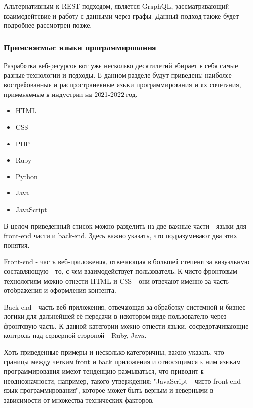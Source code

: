         Альтернативным к REST подходом, является GraphQL, рассматривающий взаимодейтсвие и работу с данными через графы.
        Данный подход также будет подробнее рассмотрен позже.


    \subsubsection{Применяемые языки программирования}
        Разработка веб-ресурсов вот уже несколько десятилетий вбирает в себя самые разные технологии и подходы.
        В данном разделе будут приведены наиболее востребованные и распространенные языки программирования и их сочетания, применяемые в индустрии на 2021-2022 год.
        \begin{itemize}
            \item HTML
            \item CSS
            \item PHP
            \item Ruby
            \item Python
            \item Java
            \item JavaScript
        \end{itemize}
        
        В целом приведенный список можно разделить на две важные части - языки для front-end части и back-end.
        Здесь важно указать, что подразумевают два этих понятия.

        Front-end - часть веб-приложения, отвечающая в большей степени за визуальную составляющую - то, с чем взаимодействует пользователь.
        К чисто фронтовым технологиям можно отнести HTML и CSS - они отвечают именно за часть отображения и оформления контента.
        
        Back-end - часть веб-приложения, отвечающая за обработку системной и бизнес-логики для дальнейшей её передачи в некотором виде пользователю через фронтовую часть.
        К данной категории можно отнести языки, сосредотачивающие контроль над серверной стороной - Ruby, Java.

        Хоть приведенные примеры и несколько категоричны, важно указать, что границы между четким front и back приложения и относящимся к ним языкам программирования имеют тенденцию размываться, что приводит к неоднозначности, например, такого утверждения: "JavaScript - чисто front-end язык программирования", которое может быть верным и неверными в зависимости от множества технических факторов.

